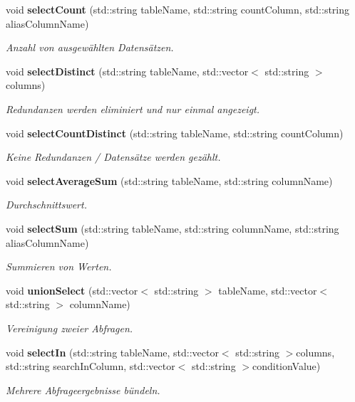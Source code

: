 \begin{DoxyCompactItemize}
void \textbf{ select\+Count} (std\+::string table\+Name, std\+::string count\+Column, std\+::string alias\+Column\+Name)
\begin{DoxyCompactList}\small\item\em Anzahl von ausgewählten Datensätzen. \end{DoxyCompactList}\item 
void \textbf{ select\+Distinct} (std\+::string table\+Name, std\+::vector$<$ std\+::string $>$ columns)
\begin{DoxyCompactList}\small\item\em Redundanzen werden eliminiert und nur einmal angezeigt. \end{DoxyCompactList}\item 
void \textbf{ select\+Count\+Distinct} (std\+::string table\+Name, std\+::string count\+Column)
\begin{DoxyCompactList}\small\item\em Keine Redundanzen / Datensätze werden gezählt. \end{DoxyCompactList}\item 
void \textbf{ select\+Average\+Sum} (std\+::string table\+Name, std\+::string column\+Name)
\begin{DoxyCompactList}\small\item\em Durchschnittswert. \end{DoxyCompactList}\item 
void \textbf{ select\+Sum} (std\+::string table\+Name, std\+::string column\+Name, std\+::string alias\+Column\+Name)
\begin{DoxyCompactList}\small\item\em Summieren von Werten. \end{DoxyCompactList}\item 
void \textbf{ union\+Select} (std\+::vector$<$ std\+::string $>$ table\+Name, std\+::vector$<$ std\+::string $>$ column\+Name)
\begin{DoxyCompactList}\small\item\em Vereinigung zweier Abfragen. \end{DoxyCompactList}\item 
void \textbf{ select\+In} (std\+::string table\+Name, std\+::vector$<$ std\+::string $>$columns, std\+::string search\+In\+Column, std\+::vector$<$ std\+::string $>$condition\+Value)
\begin{DoxyCompactList}\small\item\em Mehrere Abfrageergebnisse bündeln. \end{DoxyCompactList}\item 

\end{DoxyCompactItemize}
